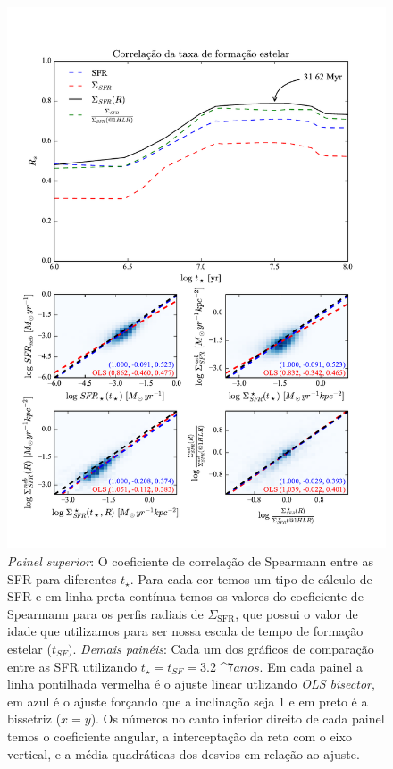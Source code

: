 \begin{figure}
	\centering
	\includegraphics[scale=0.7, clip]{figuras/Rs_allSFR.pdf}
	\caption[Comparação entre as SFR.]
	{\emph{Painel superior}: O coeficiente de correlação de Spearmann entre as SFR para diferentes
$t_\star$. Para cada cor temos um tipo de cálculo de SFR e em linha preta contínua temos os valores
do coeficiente de Spearmann para os perfis radiais de $\Sigma_{\mathrm{SFR}}$, que possui o valor de
idade que utilizamos para ser nossa escala de tempo de formação estelar ($t_{SF})$. \emph{Demais
painéis}: Cada um dos gráficos de comparação entre as SFR utilizando $t_\star = t_{SF} = $3.2 ^7$ anos$. Em cada painel a linha pontilhada vermelha é o ajuste linear utlizando {\em OLS
bisector}, em azul é o ajuste forçando que a inclinação seja 1 e em preto é a bissetriz ($x = y$).
Os números no canto inferior direito de cada painel temos o coeficiente angular, a interceptação da
reta com o eixo vertical, e a média quadráticas dos desvios em relação ao ajuste.}
	\label{fig:SFRsynvsneb}
\end{figure}

